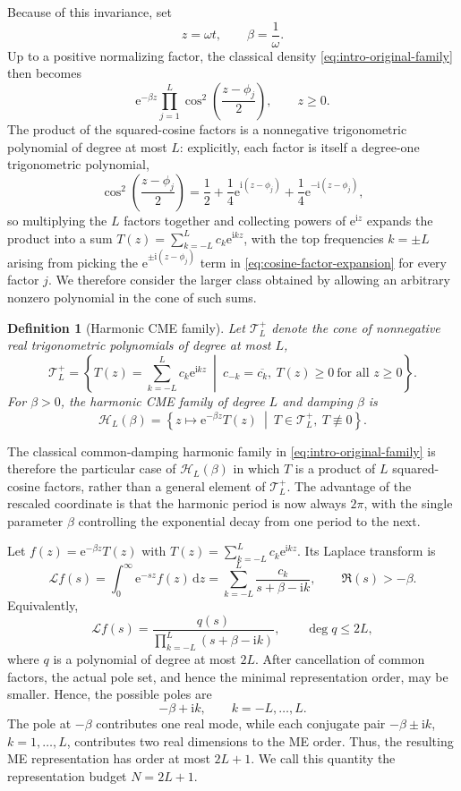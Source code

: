 \documentclass[11pt]{article}
\numberwithin{equation}{section}
\newtheorem{definition}[theorem]{Definition}
\theoremstyle{remark}
\newcommand{\e}{\mathrm e}
\newcommand{\ii}{\mathrm i}
\newcommand{\dd}{\,\mathrm d}
\newcommand{\Tcal}{\mathcal T}
\newcommand{\Hcal}{\mathcal H}
\begin{document}
Because of this invariance, set
\[
  z=\omega t,
  \qquad
  \beta=\frac1\omega.
\]
Up to a positive normalizing factor, the classical density \eqref{eq:intro-original-family} then becomes
\begin{equation}\label{eq:intro-scaled-family}
  \e^{-\beta z}\prod_{j=1}^{L}
  \cos^2\!\left(\frac{z-\phi_j}{2}\right),
  \qquad z\geq0.
\end{equation}
The product of the squared-cosine factors is a nonnegative trigonometric polynomial of degree at most $L$: explicitly, each factor is itself a degree-one trigonometric polynomial,
\begin{equation}\label{eq:cosine-factor-expansion}
  \cos^2\!\left(\frac{z-\phi_j}{2}\right)
  =\frac12+\frac14\e^{\ii(z-\phi_j)}+\frac14\e^{-\ii(z-\phi_j)},
\end{equation}
so multiplying the $L$ factors together and collecting powers of $\e^{\ii z}$ expands the product into a sum $T(z)=\sum_{k=-L}^{L}c_k\e^{\ii kz}$, with the top frequencies $k=\pm L$ arising from picking the $\e^{\pm\ii(z-\phi_j)}$ term in \eqref{eq:cosine-factor-expansion} for every factor $j$. We therefore consider the larger class obtained by allowing an arbitrary nonzero polynomial in the cone of such sums.

\begin{definition}[Harmonic CME family]\label{def:harmonic-cme}
Let $\Tcal_L^+$ denote the cone of nonnegative real trigonometric polynomials of degree at most $L$,
\[
  \Tcal_L^+
  =\left\{
    T(z)=\sum_{k=-L}^{L}c_k\e^{\ii kz}
    \ \middle|\
    c_{-k}=\overline{c_k},\ T(z)\geq0\ \text{for all }{z \geq 0}
   \right\}.
\]
For $\beta>0$, the harmonic CME family of degree $L$ and damping $\beta$ is
\[
  \Hcal_L(\beta)
  =\left\{z\mapsto\e^{-\beta z}T(z)
    \ \middle|\
    T\in\Tcal_L^+,\ T\not\equiv0\right\}.
\]
\end{definition}

The classical common-damping harmonic family in \eqref{eq:intro-original-family} is therefore the particular case of $\Hcal_L(\beta)$ in which $T$ is a product of $L$ squared-cosine factors, rather than a general element of $\Tcal_L^+$. The advantage of the rescaled coordinate is that the harmonic period is now always $2\pi$, with the single parameter $\beta$ controlling the exponential decay from one period to the next.

Let $f(z)=\e^{-\beta z}T(z)$ with $T(z)=\sum_{k=-L}^{L}c_k\e^{\ii kz}$. Its Laplace transform is
\[
  \mathcal L f(s)
  =\int_0^\infty \e^{-sz}f(z)\dd z
  =\sum_{k=-L}^{L}\frac{c_k}{s+\beta-\ii k},
  \qquad \Re(s)>-\beta.
\]
Equivalently,
\[
  \mathcal L f(s)
  =\frac{q(s)}{\displaystyle\prod_{k=-L}^{L}(s+\beta-\ii k)},
  \qquad \deg q\leq 2L,
\]
where $q$ is a polynomial of degree at most $2L$. After cancellation of common factors, the actual pole set, and hence the minimal representation order, may be smaller. Hence, the possible poles are
\[
  -\beta+\ii k,
  \qquad {k=-L,\ldots,L}.
\]
The pole at $-\beta$ contributes one real mode, while each conjugate pair $-\beta\pm\ii k$, $k=1,\ldots,L$, contributes two real dimensions to the ME order. Thus, the resulting ME representation has order at most $2L+1$. We call this quantity the representation budget $N=2L+1$.
\end{document}
